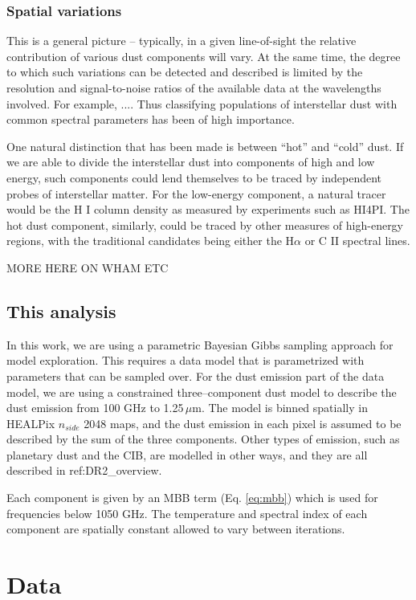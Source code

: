 \documentclass{aa}
\begin{document}
\subsubsection{Spatial variations}
This is a general picture -- typically, in a given line-of-sight the relative contribution of various dust components will vary. At the same time, the degree to which such variations can be detected and described is limited by the resolution and signal-to-noise ratios of the available data at the wavelengths involved. For example, .... Thus classifying populations of interstellar dust with common spectral parameters has been of high importance.

One natural distinction that has been made is between ``hot'' and ``cold'' dust. If we are able to divide the interstellar dust into components of high and low energy, such components could lend themselves to be traced by independent probes of interstellar matter. For the low-energy component, a natural tracer would be the H I column density as measured by experiments such as HI4PI. The hot dust component, similarly, could be traced by other measures of high-energy regions, with the traditional candidates being either the H$\alpha$ or C II spectral lines.

MORE HERE ON WHAM ETC

\subsection{This analysis}
In this work, we are using a parametric Bayesian Gibbs sampling approach for model exploration. This requires a data model that is parametrized with parameters that can be sampled over. For the dust emission part of the data model, we are using a constrained three--component dust model to describe the dust emission from 100 GHz to 1.25\,$\mu$m. The model is binned spatially in HEALPix $n_{side}$ 2048 maps, and the dust emission in each pixel is assumed to be described by the sum of the three components. Other types of emission, such as planetary dust and the CIB, are modelled in other ways, and they are all described in {ref:DR2_overview}.

Each component is given by an MBB term (Eq. \eqref{eq:mbb}) which is used for frequencies below 1050 GHz. The temperature and spectral index of each component are spatially constant allowed to vary between iterations.


\clearpage
\section{Data}
\end{document}
